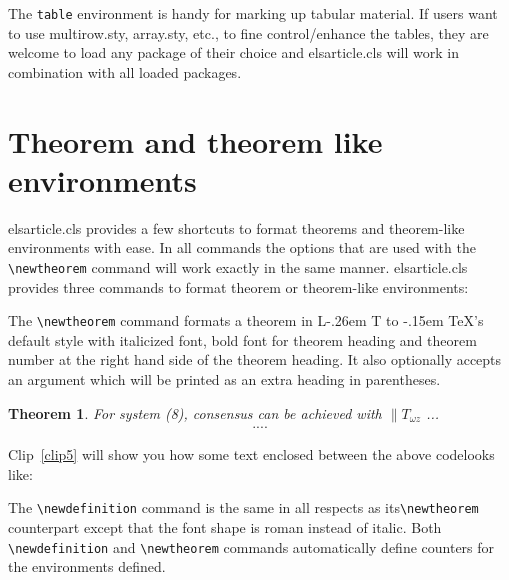 \documentclass[a4paper,12pt]{article}
\makeatletter
\def\bs{\expandafter\@gobble\string\\}
\def\file#1{\textsf{#1}\xspace}
\DeclareRobustCommand{\LaTeX}{L\kern-.26em%
        {\sbox\z@ T%
         \vbox to\ht\z@{\hbox{\check@mathfonts
           \fontsize\sf@size\z@
           \math@fontsfalse\selectfont
          A\,}%
         \vss}%
        }%
     \kern-.15em%
    \TeX}
\makeatother
\begin{document}
The \verb+table+ environment is handy for marking up tabular
material. If users want to use \file{multirow.sty},
\file{array.sty}, etc., to fine control/enhance the tables, they
are welcome to load any package of their choice and
\file{elsarticle.cls} will work in combination with all loaded
packages.

\section[Theorem and ...]{Theorem and theorem like environments}

\file{elsarticle.cls} provides a few shortcuts to format theorems and
theorem-like environments with ease. In all commands the options that
are used with the \verb+\newtheorem+ command will work exactly in the same
manner. \file{elsarticle.cls} provides three commands to format theorem or
theorem-like environments: 

\begin{vquote}
 \newtheorem{them}{Theorem}
 \newtheorem{lem}[them]{Lemma}
\end{vquote}

The \verb+\newtheorem+ command formats a
theorem in \LaTeX's default style with italicized font, bold font
for theorem heading and theorem number at the right hand side of the
theorem heading.  It also optionally accepts an argument which
will be printed as an extra heading in parentheses. 

\begin{vquote}
  \begin{them} 
   For system (8), consensus can be achieved with 
   $\|T_{\omega z}$
   ...
     \begin{eqnarray}\label{10}
     ....
     \end{eqnarray}
  \end{them}
\end{vquote}  

Clip~\ref{clip5} will show you how some text enclosed between the
above code\goodbreak \noindent looks like:

\vspace*{6pt}
\def\rulecolor{blue!70}
\src{{\ttfamily\color{verbcolor}\bs newtheorem}}
\def\rulecolor{orange}

The \verb+\newdefinition+ command is the same in
all respects as its\linebreak \verb+\newtheorem+ counterpart except that
the font shape is roman instead of italic.  Both
\verb+\newdefinition+ and \verb+\newtheorem+ commands
automatically define counters for the environments defined.
\end{document}
